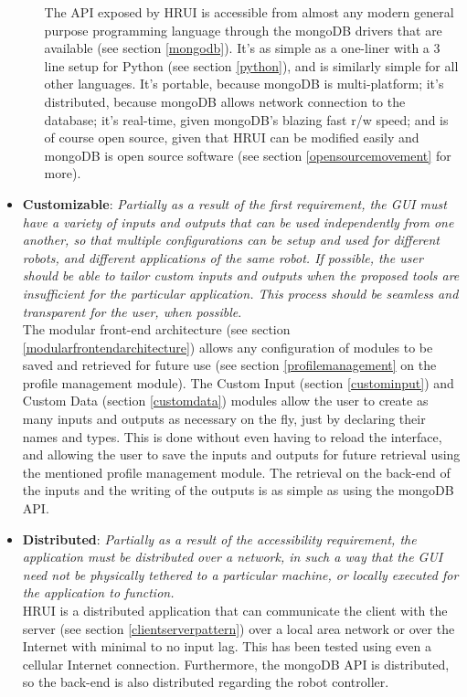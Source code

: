 \begin{itemize}
\begin{itemize}
		The API exposed by HRUI is accessible from almost any modern general purpose programming language through the 
		mongoDB drivers that are available (see section \ref{mongodb}). It's as simple as a one-liner with a 3 line setup 
		for Python (see section \ref{python}), and is similarly simple for all other languages. It's portable, because 
		mongoDB is multi-platform; it's distributed, because mongoDB allows network connection to the database; it's 
		real-time, given mongoDB's blazing fast r/w speed; and is of course open source, given that HRUI can be modified 
		easily and mongoDB is open source software (see section \ref{opensourcemovement} for more).
	\end{itemize}
	\item \textbf{Customizable}: \textit{Partially as a result of the first requirement, the GUI must have a variety of 
	inputs and outputs that can be used independently from one another, so that multiple configurations can be setup and 
	used for different robots, and different applications of the same robot. If possible, the user should be able to tailor 
	custom inputs and outputs when the proposed tools are insufficient for the particular application. This process should 
	be seamless and transparent for the user, when possible}.\\

	The modular front-end architecture (see section \ref{modularfrontendarchitecture}) allows any configuration of modules 
	to be saved and retrieved for future use (see section \ref{profilemanagement} on the profile management module). The 
	Custom Input (section \ref{custominput}) and Custom Data (section \ref{customdata}) modules allow the user to create as 
	many inputs and outputs as necessary on the fly, just by declaring their names and types. This is done without even 
	having to reload the interface, and allowing the user to save the inputs and outputs for future retrieval using the 
	mentioned profile management module. The retrieval on the back-end of the inputs and the writing of the outputs is as 
	simple as using the mongoDB API.

	\item \textbf{Distributed}: \textit{Partially as a result of the accessibility requirement, the application must be 
	distributed over a network, in such a way that the GUI need not be physically tethered to a particular machine, or 
	locally executed for the application to function.}\\

	HRUI is a distributed application that can communicate the client with the server (see section 
	\ref{clientserverpattern}) over a local area network or over the Internet with minimal to no input lag. This has been 
	tested using even a cellular Internet connection. Furthermore, the mongoDB API is distributed, so the back-end is also 
	distributed regarding the robot controller.


\end{itemize}
